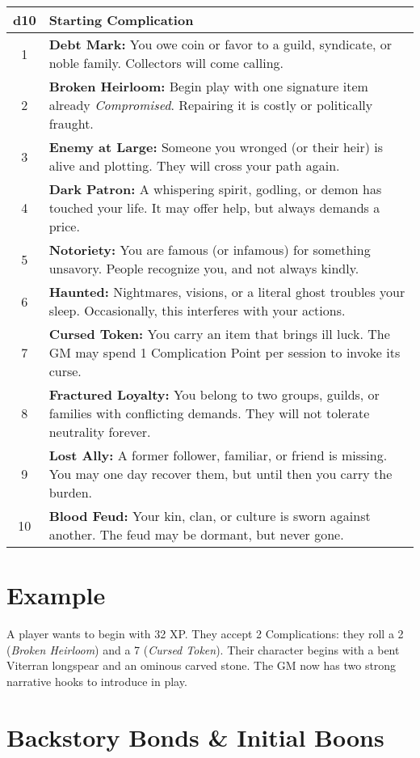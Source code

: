 \documentclass[12pt]{book}
\begin{document}
\begin{tabular}{|c|p{10cm}|}
\hline
\textbf{d10} & \textbf{Starting Complication} \\
\hline
1 & \textbf{Debt Mark:} You owe coin or favor to a guild, syndicate, or noble family. Collectors will come calling. \\
\hline
2 & \textbf{Broken Heirloom:} Begin play with one signature item already \emph{Compromised}. Repairing it is costly or politically fraught. \\
\hline
3 & \textbf{Enemy at Large:} Someone you wronged (or their heir) is alive and plotting. They will cross your path again. \\
\hline
4 & \textbf{Dark Patron:} A whispering spirit, godling, or demon has touched your life. It may offer help, but always demands a price. \\
\hline
5 & \textbf{Notoriety:} You are famous (or infamous) for something unsavory. People recognize you, and not always kindly. \\
\hline
6 & \textbf{Haunted:} Nightmares, visions, or a literal ghost troubles your sleep. Occasionally, this interferes with your actions. \\
\hline
7 & \textbf{Cursed Token:} You carry an item that brings ill luck. The GM may spend 1 Complication Point per session to invoke its curse. \\
\hline
8 & \textbf{Fractured Loyalty:} You belong to two groups, guilds, or families with conflicting demands. They will not tolerate neutrality forever. \\
\hline
9 & \textbf{Lost Ally:} A former follower, familiar, or friend is missing. You may one day recover them, but until then you carry the burden. \\
\hline
10 & \textbf{Blood Feud:} Your kin, clan, or culture is sworn against another. The feud may be dormant, but never gone. \\
\hline
\end{tabular}

\section{Example}
A player wants to begin with 32 XP.  
They accept 2 Complications: they roll a 2 (\emph{Broken Heirloom}) and a 7 (\emph{Cursed Token}).  
Their character begins with a bent Viterran longspear and an ominous carved stone.  
The GM now has two strong narrative hooks to introduce in play.

\section*{Backstory Bonds \& Initial Boons}
\end{document}
